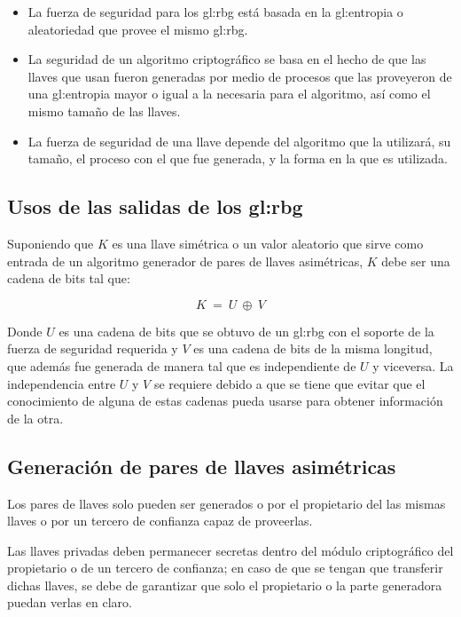 \begin{itemize}
  \item La fuerza de seguridad para los \gls{gl:rbg} está basada en la
    \gls{gl:entropia} o aleatoriedad que provee el mismo \gls{gl:rbg}.

  \item La seguridad de un algoritmo criptográfico se basa en el hecho de
    que las llaves que usan fueron generadas por medio de procesos que las
    proveyeron de una \gls{gl:entropia} mayor o igual a la necesaria para el
    algoritmo, así como el mismo tamaño de las llaves.

  \item La fuerza de seguridad de una llave depende del algoritmo que la
    utilizará, su tamaño, el proceso con el que fue generada, y la forma en
    la que es utilizada.

\end{itemize}

\subsection{Usos de las salidas de los \gls{gl:rbg}}
Suponiendo que $K$ es una llave simétrica o un valor aleatorio que sirve
como entrada de un algoritmo generador de pares de llaves asimétricas, $K$
debe ser una cadena de bits tal que:

\begin{equation}
  \label{bits_K}
  K\: =\: U\: \oplus\: V
\end{equation}

Donde $U$ es una cadena de bits que se obtuvo de un \gls{gl:rbg} con el
soporte de la fuerza de seguridad requerida y $V$ es una cadena de bits de la
misma longitud, que además fue generada de manera tal que es independiente de
$U$ y viceversa. La independencia entre $U$ y $V$ se requiere debido a que se
tiene que evitar que el conocimiento de alguna de estas cadenas pueda usarse
para obtener información de la otra.

\subsection{Generación de pares de llaves asimétricas}
Los pares de llaves solo pueden ser generados o por el propietario del las
mismas llaves o por un tercero de confianza capaz de proveerlas.

Las llaves privadas deben permanecer secretas dentro del módulo criptográfico
del propietario o de un tercero de confianza; en caso de que se tengan que
transferir dichas llaves, se debe de garantizar que solo el propietario o la
parte generadora puedan verlas en claro.

